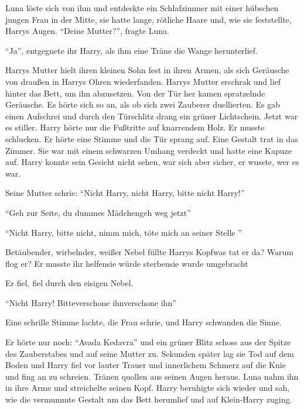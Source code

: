Luna löste sich von ihm und entdeckte ein Schlafzimmer mit einer hübschen jungen Frau in der Mitte, sie hatte lange, rötliche Haare und, wie sie feststellte, Harrys Augen. \enquote{Deine Mutter?}, fragte Luna.

\enquote{Ja}, entgegnete ihr Harry,  als ihm eine Träne die Wange herunterlief.

Harrys Mutter hielt ihren kleinen Sohn fest in ihren Armen, als sich Geräusche von draußen in Harrys Ohren wiederfanden. Harrys Mutter erschrak und lief hinter das Bett, um ihn abzusetzen. Von der Tür her kamen spratzelnde Geräusche. Es hörte sich so an, als ob sich zwei Zauberer duellierten. Es gab einen Aufschrei und durch den Türschlitz drang ein grüner Lichtschein. Jetzt war es stiller. Harry hörte nur die Fußtritte auf knarrendem Holz. Er musste schlucken. Er hörte eine Stimme und die Tür sprang auf. Eine Gestalt trat in das Zimmer. Sie war mit einem schwarzen Umhang verdeckt und hatte eine Kapuze auf. Harry konnte sein Gesicht nicht sehen, war sich aber sicher, er wusste, wer es war.

Seine Mutter schrie: \enquote{Nicht Harry, nicht Harry, bitte nicht Harry!}

\enquote{Geh zur Seite, du dummes Mädchen\abs geh weg jetzt\abs}

\enquote{Nicht Harry, bitte nicht, nimm mich, töte mich an seiner Stelle \gst}

Betäubender, wirbelnder, weißer Nebel füllte Harrys Kopf\abs was tat er da? Warum flog er? Er musste ihr helfen\abs sie würde sterben\abs sie wurde umgebracht\abs

Er fiel, fiel durch den eisigen Nebel.

\enquote{Nicht Harry! Bitte\abs verschone ihn\abs verschone ihn\abs}

Eine schrille Stimme lachte, die Frau schrie, und Harry schwanden die Sinne.

Er hörte nur noch: \enquote{Avada Kedavra} und ein grüner Blitz schoss aus der Spitze des Zauberstabes und auf seine Mutter zu. Sekunden später lag sie Tod auf dem Boden und Harry fiel vor lauter Trauer und innerlichem Schmerz auf die Knie und fing an zu schreien. Tränen quollen aus seinen Augen heraus. Luna nahm ihn in ihre Arme und streichelte seinen Kopf. Harry beruhigte sich wieder und sah, wie die vermummte Gestalt um das Bett herumlief und auf Klein-Harry zuging.

